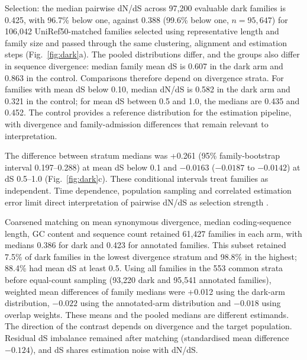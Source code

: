 \documentclass[11pt]{article}
\begin{document}
Selection: the median pairwise dN/dS across 97{,}200 evaluable dark families is 0.425, with 96.7\%
below one, against 0.388 (99.6\% below one, $n = 95{,}647$) for 106{,}042 UniRef50-matched families
selected using representative length and family size and passed through the same clustering,
alignment and estimation steps (Fig.~\ref{fig:dark}a). The pooled distributions differ, and the groups also differ in sequence divergence: median
family mean dS is 0.607 in the dark arm and 0.863 in the control. Comparisons therefore depend
on divergence strata. For families with mean dS below 0.10, median dN/dS is 0.582 in the dark
arm and 0.321 in the control; for mean dS between 0.5 and 1.0, the medians are 0.435 and 0.452.
The control provides a reference distribution for the estimation pipeline, with divergence and
family-admission differences that remain relevant to interpretation.

The difference between stratum medians was +0.261 (95\% family-bootstrap interval
0.197--0.288) at mean dS below 0.1 and $-0.0163$ ($-0.0187$ to $-0.0142$) at dS 0.5--1.0
(Fig.~\ref{fig:dark}c). These conditional intervals treat families as independent.
Time dependence, population sampling and correlated estimation error limit direct interpretation
of pairwise dN/dS as selection strength \citep{kryazhimskiy2008dnds,mugal2014time}.

Coarsened matching on mean synonymous divergence, median coding-sequence length, GC content
and sequence count retained 61{,}427 families in each arm, with medians 0.386 for dark and 0.423 for annotated families.
This subset retained 7.5\% of dark families in the lowest divergence stratum and 98.8\% in
the highest; 88.4\% had mean dS at least 0.5. Using all families in the 553 common strata before equal-count sampling
(93{,}220 dark and 95{,}541 annotated families), weighted mean differences of family medians were +0.012 using the dark-arm distribution,
$-0.022$ using the annotated-arm distribution and $-0.018$ using overlap weights.
These means and the pooled medians are different estimands. The direction of the contrast
depends on divergence and the target population. Residual dS imbalance remained after matching
(standardised mean difference $-0.124$), and dS shares estimation noise with dN/dS.
\end{document}
